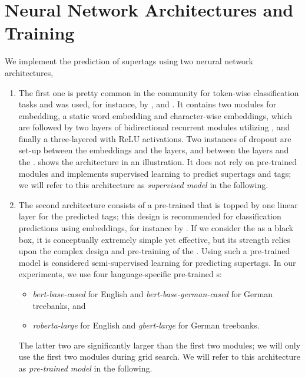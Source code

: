 \documentclass[../../document.tex]{subfiles}
\begin{document}
    \section{Neural Network Architectures and Training}\label{sec:models}
    We implement the prediction of supertags using two nerural network architectures, 
    \begin{enumerate}
        \item
            The first one is pretty common in the  community for token-wise classification tasks and was used, for instance, by \citet{vaswani2016supertagging}, \citet{StaSte20} and \citet{Cor20}.
            It contains two modules for embedding, a static word embedding and character-wise embeddings, which are followed by two layers of bidirectional recurrent modules utilizing , and finally a three-layered  with ReLU activations.
            Two instances of dropout are set-up between the embeddings and the  layers, and between the  layers and the .
             shows the architecture in an illustration.
            It does not rely on pre-trained modules and implements supervised learning to predict supertags and  tags; we will refer to this architecture as \emph{supervised model} in the following.
        \item
            The second architecture consists of a pre-trained  that is topped by one linear layer for the predicted tags; this design is recommended for classification predictions using  embeddings, for instance by \citet{Devlin2019}.
            If we consider the  as a black box, it is conceptually extremely simple yet effective, but its strength relies upon the complex design and pre-training of the .
            Using such a pre-trained model is considered semi-supervised learning for predicting supertags.
            In our experiments, we use four language-specific pre-trained s:
            \begin{itemize}
                \item \emph{bert-base-cased} for English and \emph{bert-base-german-cased} \citep{Devlin2019} for German treebanks, and
                \item \emph{roberta-large} \citep{roberta} for English and \emph{gbert-large} \citep{Cha20} for German treebanks.
            \end{itemize}
            The latter two are significantly larger than the first two modules; we will only use the first two modules during grid search.
            We will refer to this architecture as \emph{pre-trained model} in the following.
    \end{enumerate}
\end{document}
